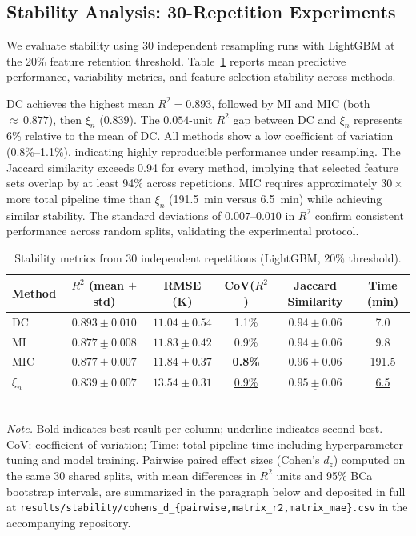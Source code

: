 \documentclass[twoside,11pt]{article}
\begin{document}
\subsection{Stability Analysis: 30-Repetition Experiments}
\label{sec:stability}
We evaluate stability using 30 independent resampling runs with LightGBM at the 20\% feature retention threshold. Table~\ref{tab:stability_results} reports mean predictive performance, variability metrics, and feature selection stability across methods. 

DC achieves the highest mean
$R^2 = 0.893$, followed by MI and MIC (both ${\approx}\,0.877$), then $\xi_n$
($0.839$). The $0.054$-unit $R^2$ gap between DC and $\xi_n$ represents 6\%
relative to the mean of DC. All methods show a low coefficient of variation
(0.8\%--1.1\%), indicating highly reproducible performance under resampling.
The Jaccard similarity exceeds 0.94 for every method, implying that selected
feature sets overlap by at least 94\% across repetitions. MIC requires
approximately $30\times$ more total pipeline time than $\xi_n$
(191.5~min versus 6.5~min) while achieving similar stability. The standard
deviations of $0.007$--$0.010$ in $R^2$ confirm consistent performance across
random splits, validating the experimental protocol.

\begin{table}[t]
\centering
\caption{Stability metrics from 30 independent repetitions
(LightGBM, 20\% threshold).}
\label{tab:stability_results}
\small
\begin{tabular}{lccccc}
\toprule
Method & $R^2$ (mean $\pm$ std) & RMSE (K) & CoV($R^2$) & Jaccard Similarity
  & Time (min) \\
\midrule
DC      & $\mathbf{0.893 \pm 0.010}$ & $\mathbf{11.04 \pm 0.54}$ & 1.1\%
  & $0.94 \pm 0.06$ & \phantom{0}7.0 \\
MI      & $\underline{0.877 \pm 0.008}$ & $\underline{11.83 \pm 0.42}$ & 0.9\%
  & $0.94 \pm 0.06$ & \phantom{0}9.8 \\
MIC     & $0.877 \pm 0.007$ & $11.84 \pm 0.37$ & \textbf{0.8\%}
  & $\mathbf{0.96 \pm 0.06}$ & 191.5 \\
$\xi_n$ & $0.839 \pm 0.007$ & $13.54 \pm 0.31$ & \underline{0.9\%}
  & $\underline{0.95 \pm 0.06}$ & \phantom{0}\underline{6.5} \\
\bottomrule
\end{tabular}
\smallskip\\
{\small\textit{Note.} Bold indicates best result per column; underline indicates
second best. CoV: coefficient of variation; Time: total pipeline time including
hyperparameter tuning and model training. Pairwise paired effect sizes
(Cohen's $d_z$) computed on the same 30 shared splits, with mean differences
in $R^{2}$ units and 95\% BCa bootstrap intervals, are summarized in the
paragraph below and deposited in full at
\texttt{results/stability/cohens\_d\_\{pairwise,matrix\_r2,matrix\_mae\}.csv}
in the accompanying repository.}
\end{table}
\end{document}
